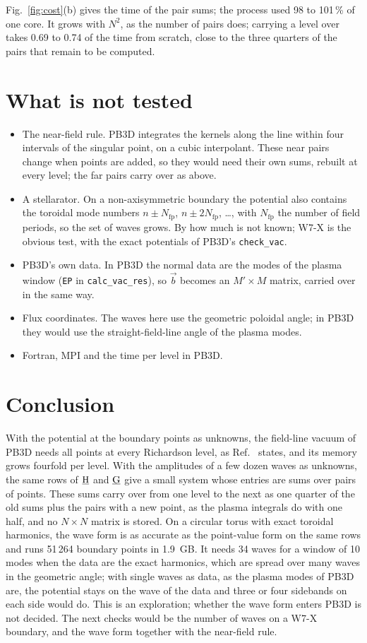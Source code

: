 \documentclass[%
 aip,
 rsi,%
 amsmath,amssymb,
 reprint,%
]{revtex4-1}
\begin{document}
Fig.~\ref{fig:cost}(b) gives the time of the pair sums; the process used 98 to 101\,\% of one core.
It grows with $N^2$, as the number of pairs does; carrying a level over takes 0.69 to 0.74 of the time from scratch, close to the three quarters of the pairs that remain to be computed.

\section{What is not tested}\label{sec:open}
\begin{itemize}
\item The near-field rule. PB3D integrates the kernels along the line within four intervals of the singular point, on a cubic interpolant. These near pairs change when points are added, so they would need their own sums, rebuilt at every level; the far pairs carry over as above.
\item A stellarator. On a non-axisymmetric boundary the potential also contains the toroidal mode numbers $n\pm N_\text{fp}$, $n\pm2N_\text{fp}$, \ldots, with $N_\text{fp}$ the number of field periods, so the set of waves grows. By how much is not known; W7-X is the obvious test, with the exact potentials of PB3D's \texttt{check\_vac}.
\item PB3D's own data. In PB3D the normal data are the modes of the plasma window (\texttt{EP} in \texttt{calc\_vac\_res}), so $\vec{b}$ becomes an $M'\times M$ matrix, carried over in the same way.
\item Flux coordinates. The waves here use the geometric poloidal angle; in PB3D they would use the straight-field-line angle of the plasma modes.
\item Fortran, MPI and the time per level in PB3D.
\end{itemize}

\section{Conclusion}\label{sec:conclusion}
With the potential at the boundary points as unknowns, the field-line vacuum of PB3D needs all points at every Richardson level, as Ref.~ states, and its memory grows fourfold per level.
With the amplitudes of a few dozen waves as unknowns, the same rows of $\underline{\mathrm{H}}$ and $\underline{\mathrm{G}}$ give a small system whose entries are sums over pairs of points.
These sums carry over from one level to the next as one quarter of the old sums plus the pairs with a new point, as the plasma integrals do with one half, and no $N\times N$ matrix is stored.
On a circular torus with exact toroidal harmonics, the wave form is as accurate as the point-value form on the same rows and runs 51\,264 boundary points in 1.9~GB.
It needs 34 waves for a window of 10 modes when the data are the exact harmonics, which are spread over many waves in the geometric angle; with single waves as data, as the plasma modes of PB3D are, the potential stays on the wave of the data and three or four sidebands on each side would do.
This is an exploration; whether the wave form enters PB3D is not decided.
The next checks would be the number of waves on a W7-X boundary, and the wave form together with the near-field rule.
\end{document}
